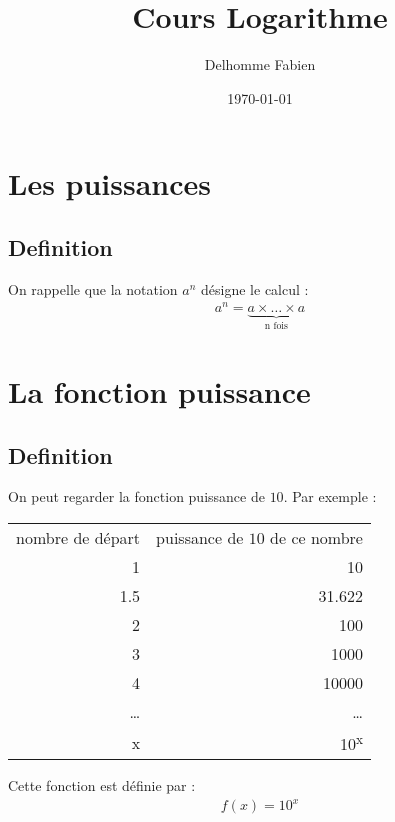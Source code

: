 \documentclass[11pt]{article}
\author{Delhomme Fabien}
\date{\today}
\title{Cours Logarithme}
\begin{document}
\maketitle

\section{Les puissances}
\label{sec:orgc083207}

\subsection{Definition}
\label{sec:org47be094}

\begin{defi}
On rappelle que la notation $a^{n}$ désigne le calcul :
\begin{align*}
    a^{n} = \underbrace{a \times \ldots \times a}_\text{n fois}
\end{align*}
\end{defi}

\section{La fonction puissance}
\label{sec:org2bca8b3}

\subsection{Definition}
\label{sec:org8154a24}

On peut regarder la fonction puissance de \(10\). Par exemple :

\begin{center}
\begin{tabular}{rr}
nombre de départ & puissance de \(10\) de ce nombre\\
1 & 10\\
1.5 & 31.622\\
2 & 100\\
3 & 1000\\
4 & 10000\\
\ldots{} & \ldots{}\\
x & 10\textsuperscript{x}\\
\end{tabular}
\end{center}

Cette fonction est définie par :
\begin{align*}
    f(x) = 10^{x}
\end{align*}
\end{document}
